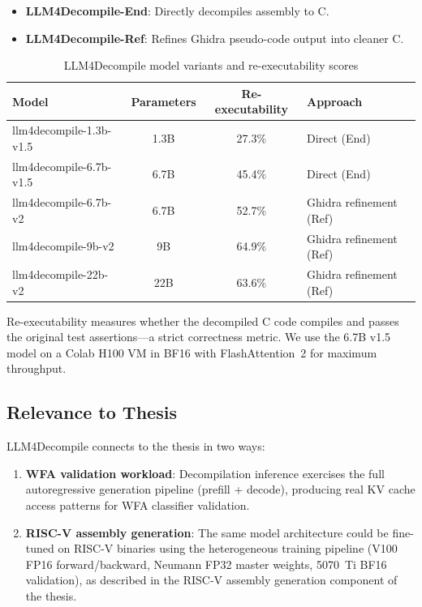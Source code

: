 \documentclass[11pt,letterpaper]{article}
\begin{document}
\begin{itemize}
    \item \textbf{LLM4Decompile-End}: Directly decompiles assembly to C.
    \item \textbf{LLM4Decompile-Ref}: Refines Ghidra pseudo-code output into cleaner C.
\end{itemize}

\begin{table}[htbp]
\centering
\caption{LLM4Decompile model variants and re-executability scores}
\label{tab:llm4decompile-models}
\begin{tabular}{@{}lccl@{}}
\toprule
\textbf{Model} & \textbf{Parameters} & \textbf{Re-executability} & \textbf{Approach} \\
\midrule
llm4decompile-1.3b-v1.5 & 1.3B & 27.3\% & Direct (End) \\
llm4decompile-6.7b-v1.5 & 6.7B & 45.4\% & Direct (End) \\
llm4decompile-6.7b-v2 & 6.7B & 52.7\% & Ghidra refinement (Ref) \\
llm4decompile-9b-v2 & 9B & 64.9\% & Ghidra refinement (Ref) \\
llm4decompile-22b-v2 & 22B & 63.6\% & Ghidra refinement (Ref) \\
\bottomrule
\end{tabular}
\end{table}

Re-executability measures whether the decompiled C code compiles and passes the original test assertions---a strict correctness metric. We use the 6.7B v1.5 model on a Colab H100 VM in BF16 with FlashAttention~2 for maximum throughput.

\subsection{Relevance to Thesis}

LLM4Decompile connects to the thesis in two ways:

\begin{enumerate}
    \item \textbf{WFA validation workload}: Decompilation inference exercises the full autoregressive generation pipeline (prefill + decode), producing real KV cache access patterns for WFA classifier validation.
    \item \textbf{RISC-V assembly generation}: The same model architecture could be fine-tuned on RISC-V binaries using the heterogeneous training pipeline (V100 FP16 forward/backward, Neumann FP32 master weights, 5070~Ti BF16 validation), as described in the RISC-V assembly generation component of the thesis.
\end{enumerate}
\end{document}

